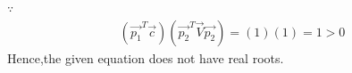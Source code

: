 \documentclass[journal,12pt,twocolumn]{IEEEtran}
\begin{document}
\begin{enumerate}
    $\because$
    \begin{align}
    (\vec{p_1}^T\vec{c})(\vec{p_2}^T\vec{V}\vec{p_2}) = (1)(1) = 1>0
    \end{align}
    Hence,the given equation does not have real roots.
    \end{enumerate}
   
\end{document}
